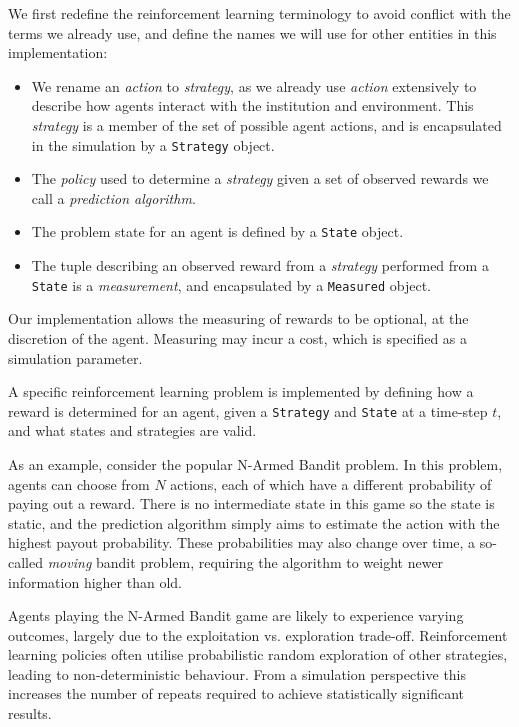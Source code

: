 We first redefine the reinforcement learning terminology to avoid conflict with the terms we already use, and define the names we will use for other entities in this implementation:
\begin{itemize}
\item We rename an \emph{action} to \emph{strategy}, as we already use \emph{action} extensively to describe how agents interact with the institution and environment. This \emph{strategy} is a member of the set of possible agent actions, and is encapsulated in the simulation by a \texttt{Strategy} object.
\item The \emph{policy} used to determine a \emph{strategy} given a set of observed rewards we call a \emph{prediction algorithm}.
\item The problem state for an agent is defined by a \texttt{State} object.
\item The tuple describing an observed reward from a \emph{strategy} performed from a \texttt{State} is a \emph{measurement}, and encapsulated by a \texttt{Measured} object.
\end{itemize}

Our implementation allows the measuring of rewards to be optional, at the
discretion of the agent. Measuring may incur a cost, which is specified as a
simulation parameter.

A specific reinforcement learning problem is implemented by defining how a
reward is determined for an agent, given a \texttt{Strategy} and
\texttt{State} at a time-step $t$, and what states and strategies are valid.

As an example, consider the popular N-Armed Bandit problem.
In this problem, agents can choose from $N$
actions, each of which have a different probability of paying out a reward.
There is no intermediate state in this game so the state is static, and
the prediction algorithm simply aims to estimate the action with the highest
payout probability. These probabilities may also change over time, a so-called \emph{moving} bandit problem, requiring the
algorithm to weight newer information higher than old.

Agents playing the N-Armed Bandit game are likely to experience varying
outcomes, largely due to the exploitation vs. exploration trade-off.
Reinforcement learning policies often utilise probabilistic random exploration
of other strategies, leading to non-deterministic behaviour. From a simulation
perspective this increases the number of repeats required to achieve
statistically significant results.

